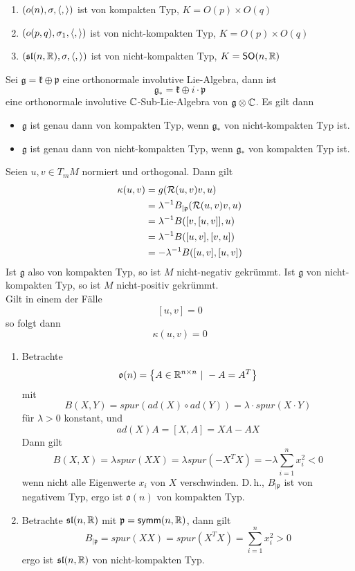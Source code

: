\documentclass{book}
\newcommand{\pf}{\mathfrak{p}}
\newcommand{\Rc}{\mathcal{R}}
\newcommand{\g}{\mathfrak{g}}
\newcommand{\kf}{\mathfrak{k}}
\newcommand{\SO}{\textsf{SO}(n,\R)}
\newcommand{\slf}{\mathfrak{sl}(n,\R)}
\newcommand{\symm}{\textsf{symm}(n,\R)}
\newcommand{\of}{\mathfrak{o}}
\begin{document}
\Bsp{}
\begin{enumerate}[1.)]
\item $(o(n), \sigma, \left<,\right>)$ ist von kompakten Typ, $K = O(p)\times O(q)$
\item $(o(p,q), \sigma_1, \left<,\right>)$ ist von nicht-kompakten Typ, $K = O(p)\times O(q)$
\item $(\slf, \sigma, \shrp{,})$ ist von nicht-kompakten Typ, $K = \SO$
\end{enumerate}

Sei $\g = \kf \oplus \pf$ eine orthonormale involutive Lie-Algebra, dann ist
\[ \g_* = \kf \oplus i \cdot \pf \]
eine orthonormale involutive $\mathbb{C}$-Sub-Lie-Algebra von $\g \otimes \C$. Es gilt dann
\begin{itemize}
\item $\g$ ist genau dann von kompakten Typ, wenn $\g_*$ von nicht-kompakten Typ ist.
\item $\g$ ist genau dann von nicht-kompakten Typ, wenn $\g_*$ von kompakten Typ ist.
\end{itemize}

Seien $u,v \in T_mM$ normiert und orthogonal. Dann gilt
\begin{align*}
\kappa(u,v) &= g(\Rc(u,v)v, u)\\
&= \lambda\i B_{|\pf}(\Rc(u,v)v,u)\\
&= \lambda\i B([v,[u,v]],u)\\
&= \lambda\i B([u,v],[v,u])\\
&= -\lambda\i B([u,v],[u,v])\\
\end{align*}
Ist $\g$ also von kompakten Typ, so ist $M$ nicht-negativ gekrümmt. Ist $\g$ von nicht-kompakten Typ, so ist $M$ nicht-positiv gekrümmt.\\
Gilt in einem der Fälle
\[ [u,v] = 0 \]
so folgt dann
\[ \kappa(u,v) = 0 \]

\Bsp{}
\begin{enumerate}[1.)]
\item Betrachte
\[ \of(n) = \set{A\in\R^{n\times n}}{-A = A^T} \]
mit
\[ B(X,Y) = spur(ad(X) \circ ad(Y)) = \lambda \cdot spur(X\cdot Y) \]
für $\lambda > 0$ konstant, und
\[ ad(X)A = [X,A] = XA -AX \]
Dann gilt
\[ B(X,X) = \lambda spur(XX) = \lambda spur(-X^TX) = -\lambda \sum_{i=1}^n x_i^2 < 0 \]
wenn nicht alle Eigenwerte $x_i$ von $X$ verschwinden. D.\,h., $B_{|\pf}$ ist von negativem Typ, ergo ist $\of(n)$ von kompakten Typ.
\item Betrachte $\slf$ mit $\pf = \symm$, dann gilt
\[ B_{|\pf} = spur(XX) = spur(X^TX) = \sum_{i =1}^nx_i^2 > 0 \]
ergo ist $\slf$ von nicht-kompakten Typ.
\end{enumerate}

\printindex
\end{document}

